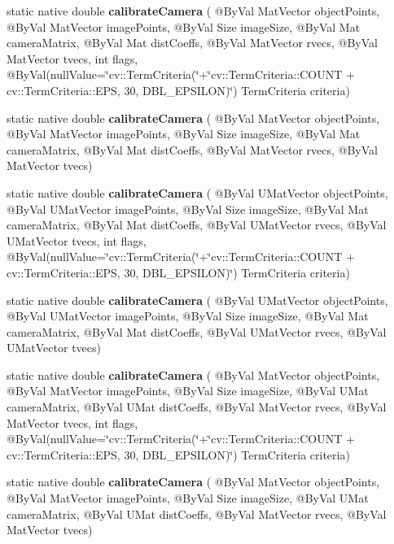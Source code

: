 \begin{DoxyCompactItemize}
\item 
static native double {\bfseries calibrate\+Camera} ( @By\+Val Mat\+Vector object\+Points, @By\+Val Mat\+Vector image\+Points, @By\+Val Size image\+Size, @By\+Val Mat camera\+Matrix, @By\+Val Mat dist\+Coeffs, @By\+Val Mat\+Vector rvecs, @By\+Val Mat\+Vector tvecs, int flags, @By\+Val(null\+Value=\char`\"{}cv\+::\+Term\+Criteria(\char`\"{}+\char`\"{}cv\+::\+Term\+Criteria\+::\+C\+O\+U\+NT + cv\+::\+Term\+Criteria\+::\+E\+PS, 30, D\+B\+L\+\_\+\+E\+P\+S\+I\+L\+ON)\char`\"{}) Term\+Criteria criteria)
\item 
static native double {\bfseries calibrate\+Camera} ( @By\+Val Mat\+Vector object\+Points, @By\+Val Mat\+Vector image\+Points, @By\+Val Size image\+Size, @By\+Val Mat camera\+Matrix, @By\+Val Mat dist\+Coeffs, @By\+Val Mat\+Vector rvecs, @By\+Val Mat\+Vector tvecs)
\item 
static native double {\bfseries calibrate\+Camera} ( @By\+Val U\+Mat\+Vector object\+Points, @By\+Val U\+Mat\+Vector image\+Points, @By\+Val Size image\+Size, @By\+Val Mat camera\+Matrix, @By\+Val Mat dist\+Coeffs, @By\+Val U\+Mat\+Vector rvecs, @By\+Val U\+Mat\+Vector tvecs, int flags, @By\+Val(null\+Value=\char`\"{}cv\+::\+Term\+Criteria(\char`\"{}+\char`\"{}cv\+::\+Term\+Criteria\+::\+C\+O\+U\+NT + cv\+::\+Term\+Criteria\+::\+E\+PS, 30, D\+B\+L\+\_\+\+E\+P\+S\+I\+L\+ON)\char`\"{}) Term\+Criteria criteria)
\item 
static native double {\bfseries calibrate\+Camera} ( @By\+Val U\+Mat\+Vector object\+Points, @By\+Val U\+Mat\+Vector image\+Points, @By\+Val Size image\+Size, @By\+Val Mat camera\+Matrix, @By\+Val Mat dist\+Coeffs, @By\+Val U\+Mat\+Vector rvecs, @By\+Val U\+Mat\+Vector tvecs)
\item 
static native double {\bfseries calibrate\+Camera} ( @By\+Val Mat\+Vector object\+Points, @By\+Val Mat\+Vector image\+Points, @By\+Val Size image\+Size, @By\+Val U\+Mat camera\+Matrix, @By\+Val U\+Mat dist\+Coeffs, @By\+Val Mat\+Vector rvecs, @By\+Val Mat\+Vector tvecs, int flags, @By\+Val(null\+Value=\char`\"{}cv\+::\+Term\+Criteria(\char`\"{}+\char`\"{}cv\+::\+Term\+Criteria\+::\+C\+O\+U\+NT + cv\+::\+Term\+Criteria\+::\+E\+PS, 30, D\+B\+L\+\_\+\+E\+P\+S\+I\+L\+ON)\char`\"{}) Term\+Criteria criteria)
\item 
static native double {\bfseries calibrate\+Camera} ( @By\+Val Mat\+Vector object\+Points, @By\+Val Mat\+Vector image\+Points, @By\+Val Size image\+Size, @By\+Val U\+Mat camera\+Matrix, @By\+Val U\+Mat dist\+Coeffs, @By\+Val Mat\+Vector rvecs, @By\+Val Mat\+Vector tvecs)

\end{DoxyCompactItemize}

